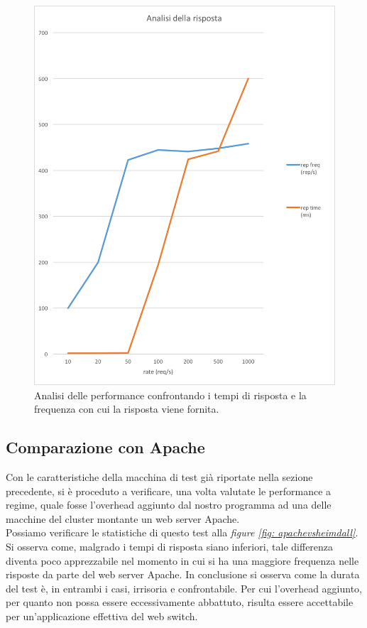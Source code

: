 \documentclass[italian]{tktltiki2}
\begin{document}
\begin{figure}[H]
\centering
\includegraphics[width=\textwidth]{images/repvsfreq}
\caption{Analisi delle performance confrontando i tempi di risposta e la frequenza con cui la risposta viene fornita.\label{fig: repvsfreq}}
\end{figure}\subsection{Comparazione con Apache}
Con le caratteristiche della macchina di test già riportate nella sezione precedente, si è proceduto a verificare, una volta valutate le performance a regime, quale fosse l'overhead aggiunto dal nostro programma ad una delle macchine del cluster montante un web server Apache. 
\\
Possiamo verificare le statistiche di questo test alla \emph{figure \ref{fig: apachevsheimdall}}. Si osserva come, malgrado i tempi di risposta siano inferiori, tale differenza diventa poco apprezzabile nel momento in cui si ha una maggiore frequenza nelle risposte da parte del web server Apache. In conclusione si osserva come la durata del test è, in entrambi i casi, irrisoria e confrontabile. Per cui l'overhead aggiunto, per quanto non possa essere eccessivamente abbattuto, risulta essere accettabile per un'applicazione effettiva del web switch.
\end{document}
